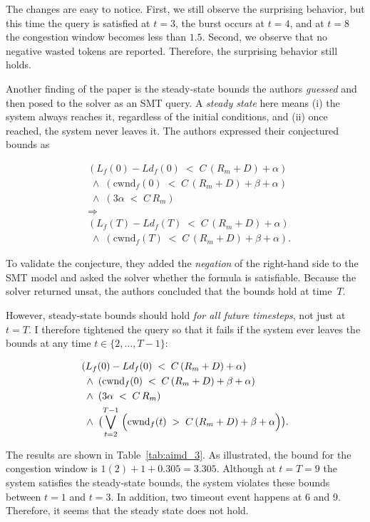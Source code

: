 \documentclass[12pt]{l4dc2023}
\begin{document}
The changes are easy to notice. First, we still observe the surprising behavior, but this time the query is satisfied at \(t=3\), the burst occurs at \(t=4\), and at \(t=8\) the congestion window becomes less than \(1.5\). Second, we observe that no negative wasted tokens are reported. Therefore, the surprising behavior still holds.

Another finding of the paper is the steady-state bounds the authors \emph{guessed} and then posed to the solver as an SMT query.  A \emph{steady state} here means (i) the system always reaches it, regardless of the initial conditions, and (ii) once reached, the system never leaves it. The authors expressed their conjectured bounds as

\begin{align*}
&(L_f(0)-Ld_f(0)\;<\;C\,(R_m+D)+\alpha)\\
&\;\wedge\;
  (\text{cwnd}_f(0)\;<\;C\,(R_m+D)+\beta+\alpha)\\
&\;\wedge\;
  (3\alpha\;<\;C\,R_m)
\\
&\Longrightarrow
\\
&(L_f(T)-Ld_f(T)\;<\;C\,(R_m+D)+\alpha)\\
&\;\wedge\;
  (\text{cwnd}_f(T)\;<\;C\,(R_m+D)+\beta+\alpha).
\end{align*}

To validate the conjecture, they added the \emph{negation} of the right-hand side to the SMT model and asked the solver whether the formula is satisfiable.  Because the solver returned \textsf{unsat},
the authors concluded that the bounds hold at time~\(T\).

However, steady-state bounds should hold \emph{for all future timesteps}, not just at \(t=T\).  I therefore tightened the query so that it fails if the system ever leaves the bounds at any time \(t\in\{2,\dots,T-1\}\):

\begin{align*}
&(L_f(0)-Ld_f(0)\;<\;C\,(R_m+D)+\alpha)\\
&\;\wedge\;
  (\text{cwnd}_f(0)\;<\;C\,(R_m+D)+\beta+\alpha)\\
&\;\wedge\;
  (3\alpha\;<\;C\,R_m)\\
&\;\wedge\;
\bigl( \bigvee_{t=2}^{T-1}\;\Bigl(\text{cwnd}_f(t)\;>\;C\,(R_m+D)+\beta+\alpha\Bigr) \bigr).
\end{align*}

The results are shown in Table~\ref{tab:aimd_3}. As illustrated, the bound for the congestion window is \(1(2)+1+0.305=3.305\). Although at \(t=T=9\) the system satisfies the steady-state bounds, the system violates these bounds between \(t=1\) and \(t=3\). In addition, two timeout event happens at 6 and 9. Therefore, it seems that the steady state does not hold.
\end{document}
